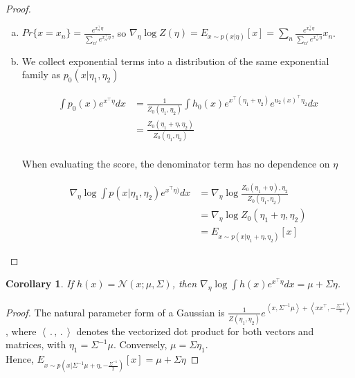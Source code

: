 \documentclass{article}
\newtheorem{corollary}{Corollary}
\begin{document}
\begin{proof}
  \begin{enumerate}[(a)]
    \item $Pr \{ x = x_n \} = \frac{ e^{ x_n^\intercal \eta} }{ \sum_{n'} e^{x_{n'}^\intercal \eta } }$, so $\nabla_\eta \log Z(\eta) = E_{x \sim p( x \vert \eta) } \left[ x \right] = \sum_n \frac{ e^{x_n^\intercal \eta } }{ \sum_{n'} e^{x_{n'}^\intercal \eta } } x_n $. \\
    \item We collect exponential terms into a distribution of the same exponential family as $p_0(x \vert \eta_1,\eta_2)$

  \begin{equation}
    \begin{split}
      \int p_0(x) e^{ x^\intercal \eta} dx 
        &= \frac{1}{Z_0(\eta_1,\eta_2)} \int h_0(x) e^{ x^\intercal ( \eta_1 + \eta_2) } e^{u_2(x)^\intercal \eta_2} dx\\
      &= \frac{Z_0(\eta_1+\eta,\eta_2)}{Z_0(\eta_1,\eta_2)} \\
    \end{split}
    \label{}
  \end{equation}

  When evaluating the score, the denominator term has no dependence on $\eta$

  \begin{equation}
    \begin{split}
      \nabla_\eta \log \int p(x \vert \eta_1,\eta_2) e^{ x^\intercal \eta)} dx
	&= \nabla_\eta \log \frac{Z_0(\eta_1+\eta),\eta_2}{Z_0(\eta_1,\eta_2)} \\
      &= \nabla_\eta \log Z_0( \eta_1 + \eta,\eta_2) \\
      &= E_{ x \sim p( x \vert \eta_1 + \eta, \eta_2)} \left[ x \right]
    \end{split}
  \end{equation} 
  \end{enumerate}
\end{proof}

\begin{corollary}
  If $h(x) = \mathcal{N}( x; \mu,\Sigma)$, then $\nabla_\eta \log \int h(x) e^{ x^\intercal \eta} dx = \mu + \Sigma \eta$.
  \label{cor gaussian update}
\end{corollary}

\begin{proof}
  The natural parameter form of a Gaussian is $\frac{1}{Z(\eta_1,\eta_2)} e^{ \left< x, \Sigma^{-1} \mu \right> + \left< x x^\intercal, - \frac{\Sigma^{-1}}{2}\right>}$, where $\left< \, . \, , \, . \, \right>$ denotes the vectorized dot product for both vectors and matrices, with $\eta_1 = \Sigma^{-1} \mu$. Conversely, $\mu = \Sigma \eta_1$. \\
  Hence, $E_{ x \sim p( x \vert \Sigma^{-1} \mu + \eta, - \frac{\Sigma^{-1}}{2}) } \left[ x \right] = \mu + \Sigma \eta$
\end{proof}
\end{document}
